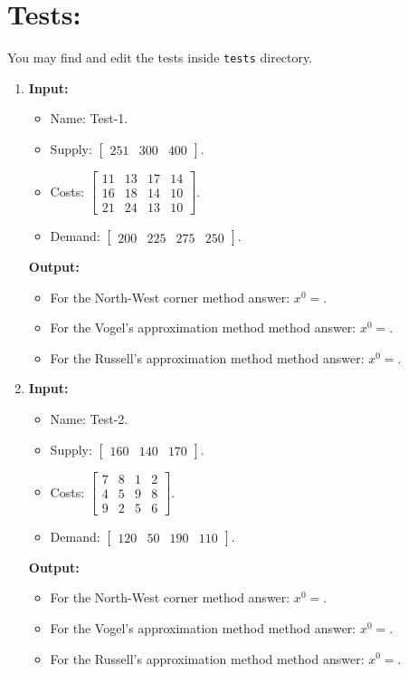 \documentclass{article}
\begin{document}
\newpage

\section*{Tests:}

You may find and edit the tests inside \texttt{tests} directory.

\begin{enumerate}[label={(\arabic*)}, itemsep=0.25in]
\item \textbf{Input:}
\begin{itemize}
\item Name: Test-1.
\item Supply: \(\begin{bmatrix} 251 & 300 & 400 \end{bmatrix}\).
\item Costs: \(\begin{bmatrix}
11 & 13 & 17 & 14 \\
16 & 18 & 14 & 10 \\
21 & 24 & 13 & 10
\end{bmatrix}\).
\item Demand: \(\begin{bmatrix} 200 & 225 & 275 & 250 \end{bmatrix}\).
\end{itemize}
\textbf{Output:}
\begin{itemize}
\item For the North-West corner method answer: \(x^0 = \).
\item For the Vogel’s approximation method method answer: \(x^0 = \).
\item For the Russell’s approximation method method answer: \(x^0 = \).
\end{itemize}

\item \textbf{Input:}
\begin{itemize}
\item Name: Test-2.
\item Supply: \(\begin{bmatrix} 160 & 140 & 170 \end{bmatrix}\).
\item Costs: \(\begin{bmatrix}
7 & 8 & 1 & 2 \\
4 & 5 & 9 & 8 \\
9 & 2 & 5 & 6
\end{bmatrix}\).
\item Demand: \(\begin{bmatrix} 120 & 50 & 190 & 110 \end{bmatrix}\).
\end{itemize}
\textbf{Output:}
\begin{itemize}
\item For the North-West corner method answer: \(x^0 = \).
\item For the Vogel’s approximation method method answer: \(x^0 = \).
\item For the Russell’s approximation method method answer: \(x^0 = \).
\end{itemize}


\end{enumerate}
\end{document}
